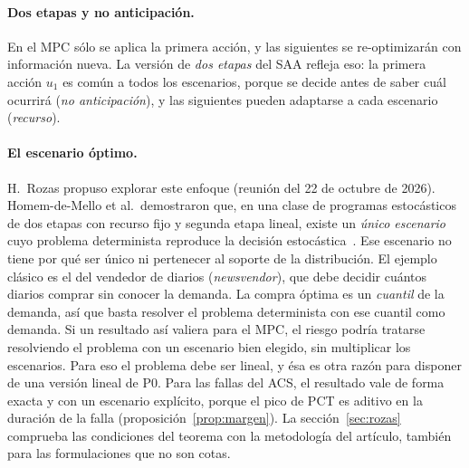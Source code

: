 \paragraph{Dos etapas y no anticipación.} En el MPC sólo se aplica la primera acción, y las
siguientes se re-optimizarán con información nueva. La versión de \emph{dos etapas} del SAA
refleja eso: la primera acción $u_1$ es común a todos los escenarios, porque se decide antes de
saber cuál ocurrirá (\emph{no anticipación}), y las siguientes pueden adaptarse a cada escenario
(\emph{recurso}).

\paragraph{El escenario óptimo.} H.~Rozas propuso explorar este enfoque (reunión del 22 de
octubre de 2026). Homem-de-Mello et al.\ demostraron que, en una clase de
programas estocásticos de dos etapas con recurso fijo y segunda etapa lineal, existe un
\emph{único escenario} cuyo problema determinista reproduce la decisión
estocástica~\cite{homem2026}. Ese escenario no tiene por qué ser único ni pertenecer al soporte
de la distribución. El ejemplo clásico es el del vendedor de diarios (\emph{newsvendor}), que
debe decidir cuántos diarios comprar sin conocer la demanda. La compra óptima es un
\emph{cuantil} de la demanda, así que basta resolver el problema determinista con ese cuantil
como demanda. Si un resultado así valiera para el MPC, el riesgo podría tratarse resolviendo
el problema con un escenario bien elegido, sin multiplicar los escenarios. Para eso el
problema debe ser lineal, y ésa es otra razón para disponer de una versión lineal de P0. Para
las fallas del ACS, el resultado vale de forma exacta y con un escenario explícito, porque el
pico de PCT es aditivo en la duración de la falla (proposición~\ref{prop:margen}). La
sección~\ref{sec:rozas} comprueba las condiciones del teorema con la metodología del artículo,
también para las formulaciones que no son cotas.

